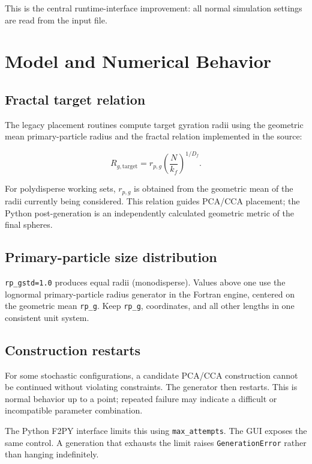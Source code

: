 \documentclass[11pt,oneside]{report}
\newcommand{\code}[1]{\texttt{#1}}
\begin{document}
This is the central runtime-interface improvement: all normal simulation
settings are read from the input file.

\chapter{Model and Numerical Behavior}

\section{Fractal target relation}

The legacy placement routines compute target gyration radii using the geometric
mean primary-particle radius and the fractal relation implemented in the source:

\begin{equation}
R_{g,\mathrm{target}} = r_{p,g}\left(\frac{N}{k_f}\right)^{1/D_f}.
\end{equation}

For polydisperse working sets, \(r_{p,g}\) is obtained from the geometric mean of
the radii currently being considered. This relation guides PCA/CCA placement;
the Python post-generation  is an
independently calculated geometric metric of the final spheres.

\section{Primary-particle size distribution}

\code{rp\_gstd=1.0} produces equal radii (monodisperse). Values above one use
the lognormal primary-particle radius generator in the Fortran engine, centered
on the geometric mean \code{rp\_g}. Keep \code{rp\_g}, coordinates, and all
other lengths in one consistent unit system.

\section{Construction restarts}

For some stochastic configurations, a candidate PCA/CCA construction cannot be
continued without violating constraints. The generator then restarts. This is
normal behavior up to a point; repeated failure may indicate a difficult or
incompatible parameter combination.

The Python F2PY interface limits this using \code{max\_attempts}. The GUI exposes
the same control. A generation that exhausts the limit raises
\code{GenerationError} rather than hanging indefinitely.
\end{document}
